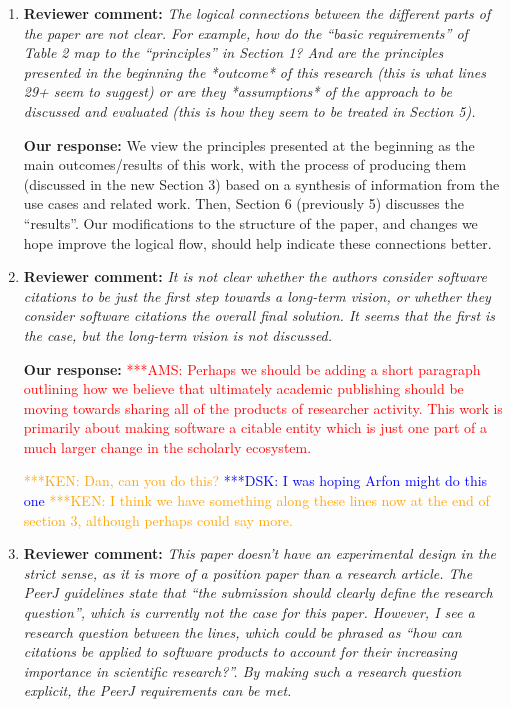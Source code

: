 \documentclass{article}
\newcommand{\katznote}[1]{ {\textcolor{blue} { ***DSK: #1 }}} %
\newcommand{\niemnote}[1]{ {\textcolor{orange} { ***KEN: #1 }}} %
\newcommand{\asnote}[1]{ {\textcolor{red} { ***AMS: #1 }}} %
\begin{document}
\begin{enumerate}
\item \textbf{Reviewer comment:}
\emph{The logical connections between the different parts of the paper are not clear. For example, how do the ``basic requirements'' of Table 2 map to the ``principles'' in Section 1? And are the principles presented in the beginning the *outcome* of this research (this is what lines 29+ seem to suggest) or are they *assumptions* of the approach to be discussed and evaluated (this is how they seem to be treated in Section 5).}

\textbf{Our response:}
We view the principles presented at the beginning as the main outcomes\slash results of this work, with the process of producing them (discussed in the new Section 3) based on a synthesis of information from the use cases and related work. Then, Section 6 (previously 5) discusses the ``results''.
Our modifications to the structure of the paper, and changes we hope improve the logical flow, should help indicate these connections better.

\item \textbf{Reviewer comment:}
\emph{It is not clear whether the authors consider software citations to be just the first step towards a long-term vision, or whether they consider software citations the overall final solution. It seems that the first is the case, but the long-term vision is not discussed.}

\textbf{Our response:}
\asnote{Perhaps we should be adding a short paragraph outlining how we believe that ultimately academic publishing should be moving towards sharing all of the products of researcher activity. This work is primarily about making software a citable entity which is just one part of a much larger change in the scholarly ecosystem.}

\niemnote{Dan, can you do this?} \katznote{I was hoping Arfon might do this one}
\niemnote{I think we have something along these lines now at the end of section 3, although perhaps could say more.}

\item \textbf{Reviewer comment:}
\emph{This paper doesn't have an experimental design in the strict sense, as it is more of a position paper than a research article. The PeerJ guidelines state that ``the submission should clearly define the research question'', which is currently not the case for this paper. However, I see a research question between the lines, which could be phrased as ``how can citations be applied to software products to account for their increasing importance in scientific research?''. By making such a research question explicit, the PeerJ requirements can be met.}


\end{enumerate}
\end{document}
